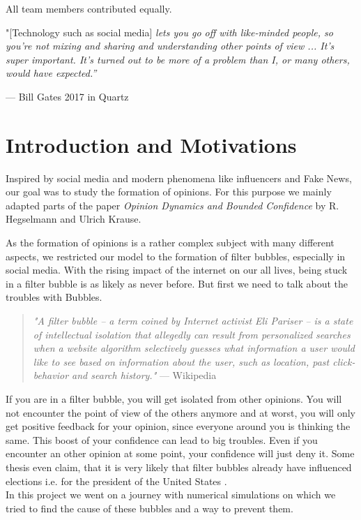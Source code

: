 \documentclass[11pt]{article}
\begin{document}
All team members contributed equally.

\vspace{\fill}
\epigraph{"[Technology such as social media] \textit{lets you go off with like-minded people, so you're not mixing and sharing and understanding other points of view ... It's super important. It's turned out to be more of a problem than I, or many others, would have expected.”}}{--- Bill Gates 2017 in Quartz \cite{quote}}
\newpage
\section{Introduction and Motivations}


Inspired by social media and modern phenomena like influencers and Fake News, our goal was to study the formation of opinions. For this purpose we mainly adapted parts of the paper \textit{Opinion Dynamics and Bounded Confidence} by R. Hegselmann and Ulrich Krause.

As the formation of opinions is a rather complex subject with many different aspects, we restricted our model to the formation of filter bubbles, especially in social media. With the rising impact of the internet on our all lives, being stuck in a filter bubble is as likely as never before. But first we need to talk about the troubles with Bubbles. 
\begin{quote}\textit{"A filter bubble – a term coined by Internet activist Eli Pariser – is a state of intellectual isolation that allegedly can result from personalized searches when a website algorithm selectively guesses what information a user would like to see based on information about the user, such as location, past click-behavior and search history."} --- Wikipedia \cite{wikiquote}
\end{quote}

If you are in a filter bubble, you will get isolated from other opinions. You will not encounter the point of view of the others anymore and at worst, you will only get positive feedback for your opinion, since everyone around you is thinking the same. This boost of your confidence can lead to big troubles. Even if you encounter an other opinion at some point, your confidence will just deny it. 
Some thesis even claim, that it is very likely that filter bubbles already have influenced elections i.e. for the president of the United States \cite{USBubble}.\\

In this project we went on a journey with numerical simulations on which we tried to find the cause of these bubbles and a way to prevent them.
\end{document}
